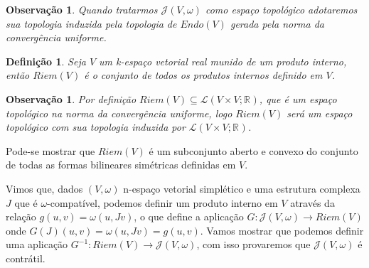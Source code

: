 \documentclass[12pt]{book}
\newtheorem{definicao}[teorema]{Definição}
\newtheorem{observacao}[teorema]{Observação}
\newcommand{\estruturascomplexaspadrao}{\mathcal{J}(V, \omega)}
\newcommand{\produtosinternos}[1]{Riem(#1)}
\newcommand{\real}[1]{\mathbb{R}^{#1}}
\newcommand{\vermelho}[1]{{\color{red}#1}}
\begin{document}
	\begin{observacao}\label{observacao_conjunto_estrutura_complexa}
		Quando tratarmos $\estruturascomplexaspadrao$ como espaço topológico adotaremos sua topologia induzida pela topologia de $Endo(V)$ gerada pela norma da convergência uniforme.
	\end{observacao}

	\begin{definicao}
		Seja $V$ um k-espaço vetorial real munido de um produto interno, então $\produtosinternos{V}$ é o conjunto de todos os produtos internos definido em $V$.
	\end{definicao}
	
	\begin{observacao}
		Por definição $\produtosinternos{V} \subseteq \mathcal{L}(V \times V; \real{})$, que é um espaço topológico na norma da convergência uniforme, logo $\produtosinternos{V}$ será um espaço topológico com sua topologia induzida por $\mathcal{L}(V \times V; \real{})$.
	\end{observacao} 
	
	\vermelho{Pode-se mostrar que $\produtosinternos{V}$ é um subconjunto aberto e convexo do conjunto de todas as formas bilineares simétricas definidas em $V$}.
	
	Vimos que, dados $(V, \omega)$ n-espaço vetorial simplético e uma estrutura complexa $J$ que é $\omega$-compatível, podemos definir um produto interno em $V$ através da relação $g(u,v) = \omega(u,Jv)$, o que define a aplicação $G:\estruturascomplexaspadrao \to \produtosinternos{V}$ onde $G(J)(u,v) = \omega(u,Jv) = g(u,v)$. Vamos mostrar que podemos definir uma aplicação $G^{-1}: \produtosinternos{V} \to \estruturascomplexaspadrao$, com isso provaremos que $\estruturascomplexaspadrao$ é contrátil.
	
\end{document}
